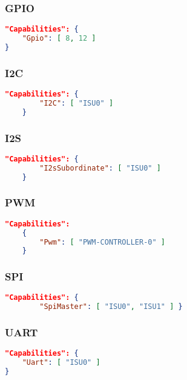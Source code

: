 \subsubsection{GPIO}
\begin{lstlisting}[language = json, firstnumber=0]	
"Capabilities": {
	"Gpio": [ 8, 12 ]
}
\end{lstlisting}

\subsubsection{I2C}
\begin{lstlisting}[language = json, firstnumber=0]	
	"Capabilities": {
		"I2C": [ "ISU0" ]
	}
\end{lstlisting}

\subsubsection{I2S}
\begin{lstlisting}[language = json, firstnumber=0]	
	"Capabilities": {
		"I2sSubordinate": [ "ISU0" ]
	}
\end{lstlisting}

\subsubsection{PWM}
\begin{lstlisting}[language = json, firstnumber=0]	
	"Capabilities": 
	{  
		"Pwm": [ "PWM-CONTROLLER-0" ] 
	}
\end{lstlisting}

\subsubsection{SPI}
\begin{lstlisting}[language = json, firstnumber=0]	
	"Capabilities": {
		"SpiMaster": [ "ISU0", "ISU1" ] }
\end{lstlisting}

\subsubsection{UART}
\begin{lstlisting}[language = json, firstnumber=0]	
"Capabilities": {
	"Uart": [ "ISU0" ]
}
\end{lstlisting}



